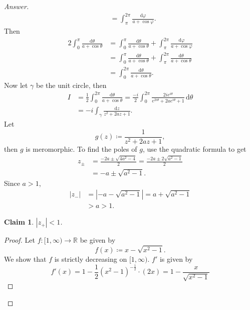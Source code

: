 \documentclass[12pt]{article}
\newcommand{\real}{\mathbb{R}}
\newcommand\paren[1]{\left( #1 \right)}
\newtheorem*{claim}{Claim}
\theoremstyle{definition}
\begin{document}
\begin{enumerate}
\begin{proof}[Answer]
\begin{align*}
            & = \int_{\pi}^{2\pi} \frac{\mathrm{d}\varphi}{a + \cos\varphi}.
        \end{align*}
        Then 
        \begin{align*}
            2\int_0^{\pi} \frac{\mathrm{d}\theta}{a + \cos \theta} & = \int_0^{\pi} \frac{\mathrm{d}\theta}{a + \cos \theta} + \int_{\pi}^{2\pi} \frac{\mathrm{d}\varphi}{a + \cos\varphi} \\
            & = \int_0^{\pi} \frac{\mathrm{d}\theta}{a + \cos \theta} + \int_{\pi}^{2\pi} \frac{\mathrm{d}\theta}{a + \cos\theta} \\
            & = \int_0^{2\pi} \frac{\mathrm{d}\theta}{a + \cos \theta}.
        \end{align*}
        Now let $\gamma$ be the unit circle, then 
        \begin{align*}
            I & = \frac{1}{2} \int_0^{2\pi} \frac{\mathrm{d}\theta}{a + \cos \theta} = \frac{-i}{2} \int_0^{2\pi } \frac{2ie^{i\theta}}{e^{2i \theta} + 2a e^{i\theta} + 1} \, \mathrm{d}\theta \\
            & = -i \int_{\gamma} \frac{ \mathrm{d}z }{ z^2 + 2az + 1 }.
        \end{align*}
        Let 
        \[
            g(z) \coloneqq \frac{1}{z^2 + 2az + 1},
        \]
        then $g$ is meromorphic. To find the poles of $g$, use the quadratic formula to get
        \begin{align*}
            z_{\pm} & = \frac{-2a \pm \sqrt{4a^2 - 4}}{2} = \frac{-2a \pm 2 \sqrt{a^2 - 1} }{ 2 } \\
            & = - a \pm \sqrt{a^2 - 1}.
        \end{align*}
        Since $a > 1$, 
        \begin{align*}
            \left| z_{-} \right| & = \left| - a - \sqrt{a^2 - 1} \right| = a + \sqrt{a^2 - 1} \\
            & > a > 1.
        \end{align*}
        \begin{claim}
            $\left| z_{+} \right| < 1$.
        \end{claim}
        \begin{proof}
            Let $f : [1,\infty) \to \real$ be given by 
            \[
                f(x) \coloneqq x - \sqrt{x^2 - 1}.
            \]
            We show that $f$ is strictly decreasing on $[1,\infty)$. $f'$ is given by 
            \[
                f'(x) = 1 - \frac{1}{2} \paren{ x^2 - 1 }^{ -\frac{1}{2} } \cdot \paren{ 2x } = 1 - \frac{ x }{ \sqrt{ x^2 - 1 } }
\]
\end{proof}
\end{proof}
\end{enumerate}
\end{document}
